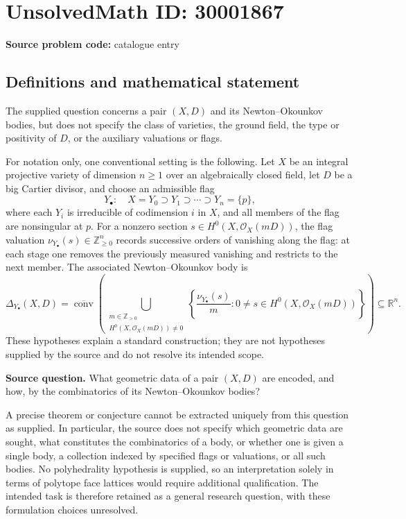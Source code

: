 \documentclass[11pt]{article}
\newcommand{\Z}{\mathbb{Z}}
\newcommand{\R}{\mathbb{R}}
\begin{document}
\section*{UnsolvedMath ID: 30001867}
\textbf{Source problem code:} catalogue entry
\subsection{Definitions and mathematical statement}
The supplied question concerns a pair \((X,D)\) and its Newton--Okounkov bodies, but does not specify the class of varieties, the ground field, the type or positivity of \(D\), or the auxiliary valuations or flags.

For notation only, one conventional setting is the following. Let \(X\) be an integral projective variety of dimension \(n\geq 1\) over an algebraically closed field, let \(D\) be a big Cartier divisor, and choose an admissible flag
\[
Y_\bullet:\quad X=Y_0\supset Y_1\supset\cdots\supset Y_n=\{p\},
\]
where each \(Y_i\) is irreducible of codimension \(i\) in \(X\), and all members of the flag are nonsingular at \(p\). For a nonzero section \(s\in H^0(X,\mathcal O_X(mD))\), the flag valuation \(\nu_{Y_\bullet}(s)\in\Z_{\geq 0}^n\) records successive orders of vanishing along the flag: at each stage one removes the previously measured vanishing and restricts to the next member. The associated Newton--Okounkov body is
\[
\Delta_{Y_\bullet}(X,D)
=
\overline{\operatorname{conv}}\left(
\bigcup_{\substack{m\in\Z_{>0}\\H^0(X,\mathcal O_X(mD))\neq 0}}
\left\{\frac{\nu_{Y_\bullet}(s)}{m}:0\neq s\in H^0(X,\mathcal O_X(mD))\right\}
\right)\subseteq\R^n.
\]
These hypotheses explain a standard construction; they are not hypotheses supplied by the source and do not resolve its intended scope.

\textbf{Source question.} What geometric data of a pair \((X,D)\) are encoded, and how, by the combinatorics of its Newton--Okounkov bodies?

A precise theorem or conjecture cannot be extracted uniquely from this question as supplied. In particular, the source does not specify which geometric data are sought, what constitutes the combinatorics of a body, or whether one is given a single body, a collection indexed by specified flags or valuations, or all such bodies. No polyhedrality hypothesis is supplied, so an interpretation solely in terms of polytope face lattices would require additional qualification. The intended task is therefore retained as a general research question, with these formulation choices unresolved.
\end{document}
